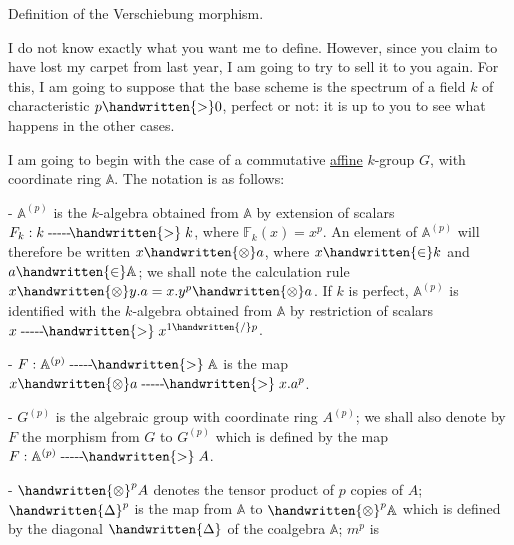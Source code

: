 
\begin{center}
Definition of the Verschiebung morphism.
\end{center}

I do not know exactly what you want me to define. However, since you claim to have lost my carpet from last year, I am going to try to sell it to you again. For this, I am going to suppose that the base scheme is the spectrum of a field $k$ of characteristic $p\handwritten{>}0$, perfect or not: it is up to you to see what happens in the other cases.

I am going to begin with the case of a commutative \uline{affine} $k$-group $G$, with coordinate ring $\mathbb{A}$. The notation is as follows:

\noindent - $\mathbb{A}^{(p)}$ is the $k$-algebra obtained from $\mathbb{A}$ by extension of scalars $F_k:k\mathrel{\text{-{}-{}-{}-{}-}\!\handwritten{>}}k$, where $\mathbb{F}_k(x)=x^p$. An element of $\mathbb{A}^{(p)}$ will therefore be written $x\handwritten{\otimes}a$, where $x\handwritten{\in}k$ and $a\handwritten{\in}\mathbb{A}$; we shall note the calculation rule $x\handwritten{\otimes}y.a=x.y^p\handwritten{\otimes}a$. If $k$ is perfect, $\mathbb{A}^{(p)}$ is identified with the $k$-algebra obtained from $\mathbb{A}$ by restriction of scalars $x\mathrel{\text{-{}-{}-{}-{}-}\!\handwritten{>}}x^{1\handwritten{/}p}$.

\noindent - $F:\mathbb{A}^{(p)}\mathrel{\text{-{}-{}-{}-{}-}\!\handwritten{>}}\mathbb{A}$ is the map  $x\handwritten{\otimes}a\mathrel{\text{-{}-{}-{}-{}-}\!\handwritten{>}}x.a^p$.

\noindent - $G^{(p)}$ is the algebraic group with coordinate ring $A^{(p)}$; we shall also denote by $F$ the morphism from $G$ to $G^{(p)}$ which is defined by the map $F:\mathbb{A}^{(p)}\mathrel{\text{-{}-{}-{}-{}-}\!\handwritten{>}}A$.

\noindent - $\handwritten{\otimes}^{p}A$ denotes the tensor product of $p$ copies of $A$; $\handwritten{\Delta}^{p}$ is the map from $\mathbb{A}$ to $\handwritten{\otimes}^{p}\mathbb{A}$ which is defined by the diagonal $\handwritten{\Delta}$ of the coalgebra $\mathbb{A}$; $m^p$ is
